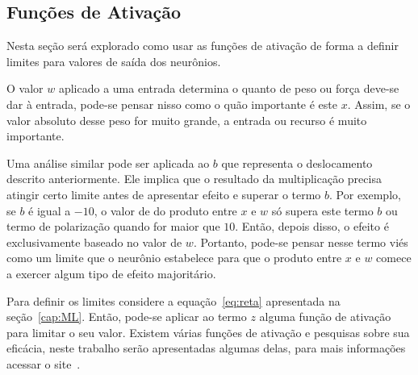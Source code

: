         \subsection{Funções de Ativação}\label{cap:funcao_ativacao}
            
            Nesta seção será explorado como usar as funções de ativação de forma a definir limites para valores de saída dos neurônios.
            
            O valor $w$ aplicado a uma entrada determina o quanto de peso ou força deve-se dar à entrada, pode-se pensar nisso como o quão importante é este $x$. Assim, se o valor absoluto desse peso for muito grande, a entrada ou recurso é muito importante. 
            
            Uma análise similar pode ser aplicada ao $b$ que representa o deslocamento descrito anteriormente. Ele implica que o resultado da multiplicação precisa atingir certo limite antes de apresentar efeito e superar o termo $b$. Por exemplo, se $b$ é igual a $-10$, o valor de do produto entre $x$ e $w$ só supera este termo $b$ ou termo de polarização quando for maior que $10$. Então, depois disso, o efeito é exclusivamente baseado no valor de $w$. Portanto, pode-se pensar nesse termo viés como um limite que o neurônio estabelece para que o produto entre $x$ e $w$ comece a exercer algum tipo de efeito majoritário. 
            
            Para definir os limites considere a equação~\ref{eq:reta} apresentada na seção~\ref{cap:ML}. Então, pode-se aplicar ao termo $z$ alguma função de ativação para limitar o seu valor. Existem várias funções de ativação e pesquisas sobre sua eficácia, neste trabalho serão apresentadas algumas delas, para mais informações acessar o site~\cite{Activati28:online}.